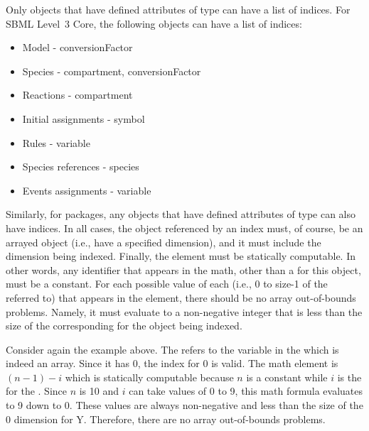 Only objects that have defined attributes of  type can have a list of indices.   For SBML Level~3 Core, the following objects can have a list of indices:
\begin{itemize}
\item Model - conversionFactor
\item Species - compartment, conversionFactor
\item Reactions - compartment
\item Initial assignments - symbol
\item Rules - variable
\item Species references - species
\item Events assignments - variable
\end{itemize}
Similarly, for packages, any objects that have defined attributes of  type can also have indices.   In all cases, the object referenced by an index must, of course, be an arrayed object (i.e., have a specified dimension), and it must include the dimension being indexed.
Finally, the  element must be statically computable.   In other words, any identifier that appears in the math, other than a \Dimension {} for this object, must be a constant.   For each possible value of each \Dimension {}  (i.e., 0 to size-1 of the \Dimension referred to) that appears in the  element, there should be no array out-of-bounds problems.   Namely, it must evaluate to a non-negative integer that is less than the size of the corresponding \Dimension for the object being indexed.    

Consider again the example above.   The \Index refers to the variable in the \AssignmentRule which is indeed an array.   Since it has  0, the index for  0 is valid.   The math element is $(n-1)  - i$ which is statically computable because $n$ is a constant \Parameter while $i$ is the \Dimension {} for the \AssignmentRule.   Since $n$ is 10 and $i$ can take values of 0 to 9, this math formula evaluates to 9 down to 0.   These values are always non-negative and less than the size of the 0 dimension for Y.   Therefore, there are no array out-of-bounds problems.

